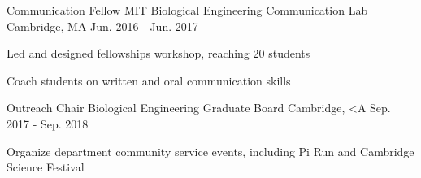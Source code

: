 

\begin{cventries}

  \cventry
    {Communication Fellow} %
    {MIT Biological Engineering Communication Lab} %
    {Cambridge, MA} %
    {Jun. 2016 - Jun. 2017} %
    {
      \begin{cvitems} %
        \item {Led and designed fellowships workshop, reaching 20 students}
        \item {Coach students on written and oral communication skills}
      \end{cvitems}
    }

  \cventry
    {Outreach Chair} %
    {Biological Engineering Graduate Board} %
    {Cambridge, <A} %
    {Sep. 2017 - Sep. 2018} %
    {
      \begin{cvitems} %
        \item {Organize department community service events, including Pi Run and Cambridge Science Festival}
      \end{cvitems}
    }

\end{cventries}
